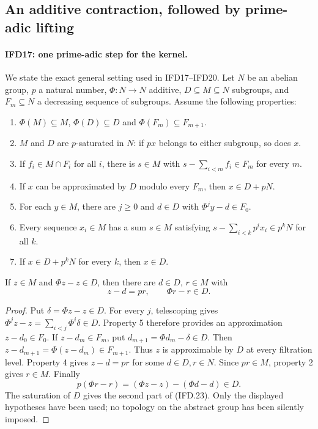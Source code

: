 \documentclass[11pt,a4paper]{article}
\numberwithin{equation}{section}
\theoremstyle{remark}\newtheorem{remark}[theorem]{Remark}
\begin{document}
\subsection{An additive contraction, followed by prime-adic lifting}

\paragraph{IFD17: one prime-adic step for the kernel.}
\label{claim:IFD17}
We state the exact general setting used in IFD17--IFD20.
Let $N$ be an abelian group, $p$ a natural number,
$\Phi:N\to N$ additive, $D\subseteq M\subseteq N$ subgroups,
and $F_m\subseteq N$ a decreasing sequence of subgroups.
Assume the following properties:
\begin{enumerate}
\item $\Phi(M)\subseteq M$, $\Phi(D)\subseteq D$ and
      $\Phi(F_m)\subseteq F_{m+1}$.
\item $M$ and $D$ are $p$-saturated in $N$: if $px$ belongs
      to either subgroup, so does $x$.
\item If $f_i\in M\cap F_i$ for all $i$, there is $s\in M$
      with $s-\sum_{i<m}f_i\in F_m$ for every $m$.
\item If $x$ can be approximated by $D$ modulo every $F_m$,
      then $x\in D+pN$.
\item For each $y\in M$, there are $j\geq0$ and $d\in D$
      with $\Phi^jy-d\in F_0$.
\item Every sequence $x_i\in M$ has a sum $s\in M$ satisfying
      $s-\sum_{i<k}p^ix_i\in p^kN$ for all $k$.
\item If $x\in D+p^kN$ for every $k$, then $x\in D$.
\end{enumerate}
If $z\in M$ and $\Phi z-z\in D$, then there are $d\in D$,
$r\in M$ with
\[
                         z-d=pr,\qquad \Phi r-r\in D.      \tag{IFD.23}
\]

\begin{proof}
Put $\delta=\Phi z-z\in D$.
For every $j$, telescoping gives
$\Phi^jz-z=\sum_{i<j}\Phi^i\delta\in D$.
Property 5 therefore provides an approximation $z-d_0\in F_0$.
If $z-d_m\in F_m$, put $d_{m+1}=\Phi d_m-\delta\in D$.
Then $z-d_{m+1}=\Phi(z-d_m)\in F_{m+1}$.
Thus $z$ is approximable by $D$ at every filtration level.
Property 4 gives $z-d=pr$ for some $d\in D,r\in N$.
Since $pr\in M$, property 2 gives $r\in M$.
Finally
\[
                p(\Phi r-r)=(\Phi z-z)-(\Phi d-d)\in D.
\]
The saturation of $D$ gives the second part of (IFD.23).
Only the displayed hypotheses have been used; no topology on the
abstract group has been silently imposed.
\end{proof}
\end{document}
